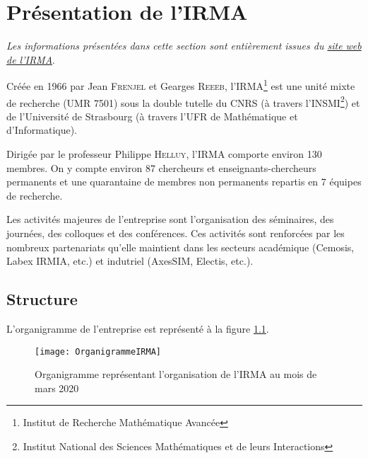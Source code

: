
\chapter{Présentation de l'IRMA} %

\label{Chapter2} %

\textit{Les informations présentées dans cette section sont entièrement issues du \href{http://irma.math.unistra.fr/}{site web de l'IRMA}}.

Créée en 1966 par Jean \textsc{Frenjel} et Gearges \textsc{Reeeb}, l'IRMA\footnote{Institut de Recherche Mathématique Avancée} est une unité mixte de recherche (UMR 7501) sous la double tutelle du CNRS (à travers l'INSMI\footnote{Institut National des Sciences Mathématiques et de leurs Interactions}) et de l’Université de Strasbourg (à travers l'UFR de Mathématique et d’Informatique).

Dirigée par le professeur Philippe \textsc{Helluy}, l'IRMA comporte environ 130 membres. On y compte environ 87 chercheurs et enseignants-chercheurs permanents et une quarantaine de membres non permanents repartis en 7 équipes de recherche.

Les activités majeures de l'entreprise sont l'organisation des séminaires, des journées, des colloques et des conférences. Ces activités sont renforcées par les nombreux partenariats qu'elle maintient dans les secteurs académique (Cemosis, Labex IRMIA, etc.) et indutriel (AxesSIM, Electis, etc.).


\section{Structure}
L'organigramme de l'entreprise est représenté à la figure \ref{fig:OrganigrammeIRMA}.

\begin{figure}[!h]
\centering
\texttt{[image: OrganigrammeIRMA]} 
\decoRule
\caption[Organigramme de l'IRMA]{Organigramme représentant l'organisation de l'IRMA au mois de mars 2020 \parencite{Reference7}}
\label{fig:OrganigrammeIRMA}
\end{figure}


